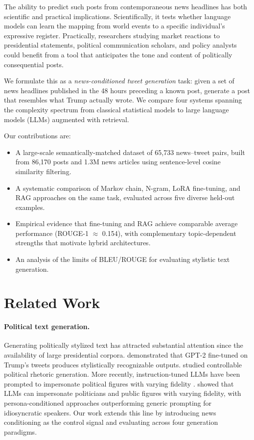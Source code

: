 \documentclass[11pt,a4paper]{article}
\begin{document}
The ability to predict such posts from contemporaneous news headlines has both scientific and practical implications. Scientifically, it tests whether language models can learn the mapping from world events to a specific individual's expressive register. Practically, researchers studying market reactions to presidential statements, political communication scholars, and policy analysts could benefit from a tool that anticipates the tone and content of politically consequential posts.

We formulate this as a \textit{news-conditioned tweet generation} task: given a set of news headlines published in the 48 hours preceding a known post, generate a post that resembles what Trump actually wrote. We compare four systems spanning the complexity spectrum from classical statistical models to large language models (LLMs) augmented with retrieval.

Our contributions are:
\begin{itemize}[noitemsep]
    \item A large-scale semantically-matched dataset of 65,733 news--tweet pairs, built from 86,170 posts and 1.3M news articles using sentence-level cosine similarity filtering.
    \item A systematic comparison of Markov chain, N-gram, LoRA fine-tuning, and RAG approaches on the same task, evaluated across five diverse held-out examples.
    \item Empirical evidence that fine-tuning and RAG achieve comparable average performance (ROUGE-1 $\approx$ 0.154), with complementary topic-dependent strengths that motivate hybrid architectures.
    \item An analysis of the limits of BLEU/ROUGE for evaluating stylistic text generation.
\end{itemize}

\section{Related Work}

\paragraph{Political text generation.}
Generating politically stylized text has attracted substantial attention since the availability of large presidential corpora. \citet{gpt2trump} demonstrated that GPT-2 fine-tuned on Trump's tweets produces stylistically recognizable outputs. \citet{rashkin2019towards} studied controllable political rhetoric generation. More recently, instruction-tuned LLMs have been prompted to impersonate political figures with varying fidelity \citep{argyle2023out}. \citet{herbold2024impersonate} showed that LLMs can impersonate politicians and public figures with varying fidelity, with persona-conditioned approaches outperforming generic prompting for idiosyncratic speakers. Our work extends this line by introducing news conditioning as the control signal and evaluating across four generation paradigms.
\end{document}
